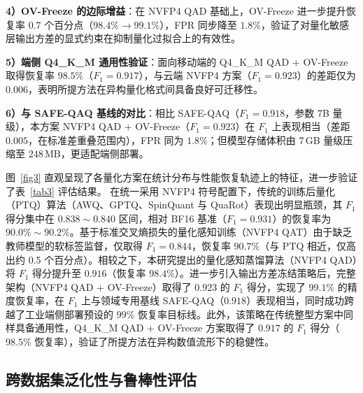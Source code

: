 \documentclass[11pt, a4paper]{article}
\begin{document}
    \textbf{4）OV-Freeze 的边际增益}：在 NVFP4 QAD 基础上，OV-Freeze 进一步提升恢复率 $0.7$ 个百分点（$98.4\%\to 99.1\%$），FPR 同步降至 $1.8\%$，验证了对量化敏感层输出方差的显式约束在抑制量化过拟合上的有效性。
    
    \textbf{5）端侧 Q4\_K\_M 通用性验证}：面向移动端的 Q4\_K\_M QAD + OV-Freeze 取得恢复率 $98.5\%$（$F_1=0.917$），与云端 NVFP4 方案（$F_1=0.923$）的差距仅为 $0.006$，表明所提方法在异构量化格式间具备良好可迁移性。
    
    \textbf{6）与 SAFE-QAQ 基线的对比}：相比 SAFE-QAQ（$F_1=0.918$，参数 7B 量级），本方案 NVFP4 QAD + OV-Freeze（$F_1=0.923$）在 $F_1$ 上表现相当（差距 $0.005$，在标准差重叠范围内），FPR 同为 $1.8\%$；但模型存储体积由 7\,GB 量级压缩至 $248\,\mathrm{MB}$，更适配端侧部署。

图~\ref{fig3} 直观呈现了各量化方案在统计分布与性能恢复轨迹上的特征，进一步验证了表~\ref{tab3} 评估结果。
 在统一采用 NVFP4 符号配置下，传统的训练后量化（PTQ）算法（AWQ、GPTQ、SpinQuant 与 QuaRot）表现出明显瓶颈，其 $F_1$ 得分集中在 $0.838 \sim 0.840$ 区间，相对 BF16 基准（$F_1=0.931$）的恢复率为 $90.0\% \sim 90.2\%$。基于标准交叉熵损失的量化感知训练（NVFP4 QAT）由于缺乏教师模型的软标签监督，仅取得 $F_1=0.844$，恢复率 $90.7\%$（与 PTQ 相近，仅高出约 0.5 个百分点）。相较之下，本研究提出的量化感知蒸馏算法（NVFP4 QAD）将 $F_1$ 得分提升至 $0.916$（恢复率 $98.4\%$）。进一步引入输出方差冻结策略后，完整架构（NVFP4 QAD + OV-Freeze）取得了 $0.923$ 的 $F_1$ 得分，实现了 $99.1\%$ 的精度恢复率，在 $F_1$ 上与领域专用基线 SAFE-QAQ（$0.918$）表现相当，同时成功跨越了工业端侧部署预设的 $99\%$ 恢复率目标线。此外，该策略在传统整型方案中同样具备通用性，Q4\_K\_M QAD + OV-Freeze 方案取得了 $0.917$ 的 $F_1$ 得分（$98.5\%$ 恢复率），验证了所提方法在异构数值流形下的稳健性。

\subsection{跨数据集泛化性与鲁棒性评估}
\end{document}
